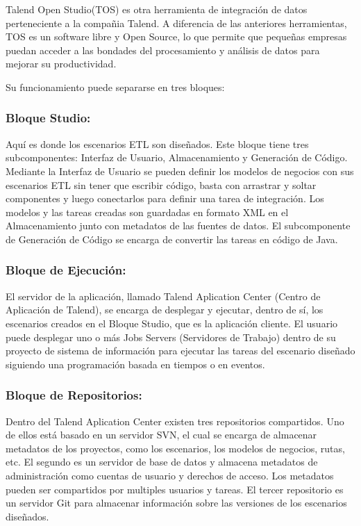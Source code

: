 Talend Open Studio(TOS) es otra herramienta de integración de datos perteneciente a la compañia Talend. A diferencia de las 
anteriores herramientas, TOS es un software libre y Open Source, lo que permite que pequeñas empresas puedan acceder a 
las bondades del procesamiento y an\'alisis de datos para mejorar su productividad. 

Su funcionamiento puede separarse en 
tres bloques: 

\subsubsection{Bloque Studio:}

Aqu\'i es donde los escenarios ETL son diseñados. Este bloque tiene tres subcomponentes: Interfaz de Usuario, Almacenamiento
y Generaci\'on de C\'odigo. Mediante la Interfaz de Usuario se pueden definir los modelos de negocios con sus escenarios ETL 
sin tener que escribir c\'odigo, basta con arrastrar y soltar componentes y luego conectarlos para definir una tarea de 
integración. Los modelos y las tareas creadas son guardadas en formato XML en el Almacenamiento junto con metadatos 
de las fuentes de datos. El subcomponente de Generaci\'on de C\'odigo se encarga de convertir las tareas en c\'odigo de 
Java. 

\subsubsection{Bloque de Ejecución:}

El servidor de la aplicaci\'on, llamado Talend Aplication 
Center (Centro de Aplicaci\'on de Talend), se encarga de desplegar y ejecutar, dentro de s\'i, los escenarios creados 
en el Bloque Studio, que es la aplicaci\'on cliente. El usuario puede desplegar uno o m\'as Jobs Servers 
(Servidores de Trabajo) dentro de su proyecto de sistema de informaci\'on para ejecutar las tareas del escenario diseñado 
siguiendo una programación basada en tiempos o en eventos. 

\subsubsection{Bloque de Repositorios:}

Dentro del Talend Aplication Center existen tres repositorios compartidos. Uno de ellos est\'a basado en un servidor SVN, 
el cual se encarga de almacenar metadatos de los proyectos, como los escenarios, los modelos de negocios, rutas, etc. 
El segundo es un servidor de base de datos y almacena metadatos de administraci\'on como cuentas de usuario y derechos de 
acceso. Los metadatos pueden ser compartidos por multiples usuarios y tareas. El tercer repositorio es un servidor 
Git para almacenar informaci\'on sobre las versiones de los escenarios diseñados.





